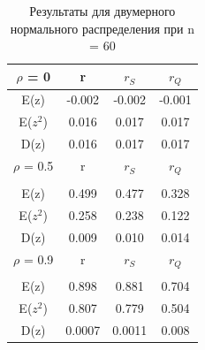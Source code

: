 \documentclass[a4]{article}
\begin{document}
		\begin{table}[h!]
			
			\caption{Результаты для двумерного нормального распределения при  n = 60}
			\label{tab:my_label}
			\begin{center}
				\vspace{5mm}
				\begin{tabular}{|c|c|c|c|}
					\hline
					$\rho$ = 0 & r & $r_S$ & $r_Q$ \\
					\hline
					E(z) & -0.002 & -0.002 & -0.001\\
					\hline
					E($z^2$)   & 0.016 & 0.017 & 0.017\\
					\hline
					D(z)   & 0.016 & 0.017 & 0.017 \\
					\hline
					$\rho$ = 0.5 & r & $r_S$ & $r_Q$ \\
					\hline\\
					\hline
					E(z) & 0.499 & 0.477 & 0.328\\
					\hline
					E($z^2$)   & 0.258 & 0.238 & 0.122\\
					\hline
					D(z)   & 0.009 & 0.010 & 0.014 \\
					\hline
					$\rho$ = 0.9 & r & $r_S$ & $r_Q$ \\
					\hline\\
					\hline
					E(z) & 0.898 & 0.881 & 0.704\\
					\hline
					E($z^2$)   & 0.807 & 0.779 & 0.504\\
					\hline
					D(z)   & 0.0007 & 0.0011 & 0.008 \\
					\hline
				\end{tabular}
				
			\end{center}
			
		\end{table}
		\newpage
\end{document}
